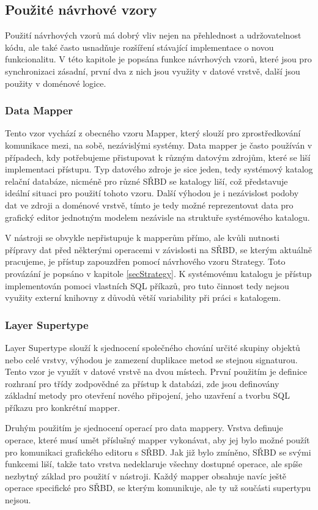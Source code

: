 \documentclass[czech,bachelor,public,dept460,male,oneside]{diploma}
\begin{document}
	\subsection{Použité návrhové vzory}
	Použití návrhových vzorů má dobrý vliv nejen na přehlednost a udržovatelnost kódu, ale také často usnadňuje rozšíření stávající implementace o novou funkcionalitu.  V této kapitole je popsána funkce návrhových vzorů, které jsou pro synchronizaci zásadní, první dva z nich jsou využity v datové vrstvě, další jsou použity v doménové logice.
	
		\subsubsection{Data Mapper}
		Tento vzor vychází z obecného vzoru Mapper, který slouží pro zprostředkování komunikace mezi, na sobě, nezávislými systémy. Data mapper je často používán v případech, kdy potřebujeme přistupovat k různým datovým zdrojům, které se liší implementaci přístupu. Typ datového zdroje je sice jeden, tedy systémový katalog relační databáze, nicméně pro různé SŘBD se katalogy liší, což představuje ideální situaci pro použití tohoto vzoru. Další výhodou je i nezávislost podoby dat ve zdroji a doménové vrstvě, tímto je tedy možné reprezentovat data pro grafický editor jednotným modelem nezávisle na struktuře systémového katalogu.
		
		V nástroji se obvykle nepřistupuje k mapperům přímo, ale kvůli nutnosti přípravy dat před některými operacemi v závislosti na SŘBD, se kterým aktuálně pracujeme, je přístup zapouzdřen pomocí návrhového vzoru Strategy. Toto provázání je popsáno v kapitole \ref{secStrategy}. K systémovému katalogu je přístup implementován pomoci vlastních SQL příkazů, pro tuto činnost tedy nejsou využity externí knihovny z důvodů větší variability při práci s katalogem.
		
		\subsubsection{Layer Supertype}
		Layer Supertype slouží k sjednocení společného chování určité skupiny objektů nebo celé vrstvy, výhodou je zamezení duplikace metod se stejnou signaturou. Tento vzor je využít v datové vrstvě na dvou místech. První použitím je definice rozhraní pro třídy zodpovědné za přístup k databázi, zde jsou definovány základní metody pro otevření nového připojení, jeho uzavření a tvorbu SQL příkazu pro konkrétní mapper. 
		
		Druhým použitím je sjednocení operací pro data mappery. Vrstva definuje operace, které musí umět příslušný mapper vykonávat, aby jej bylo možné použít pro komunikaci grafického editoru s SŘBD. Jak již bylo zmíněno, SŘBD se svými funkcemi liší, takže tato vrstva nedeklaruje všechny dostupné operace, ale spíše nezbytný základ pro použití v nástroji. Každý mapper obsahuje navíc ještě operace specifické pro SŘBD, se kterým komunikuje, ale ty už součásti supertypu nejsou.
	
\end{document}
